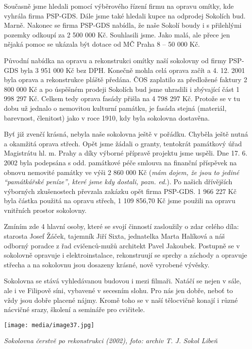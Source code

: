 Současně jsme hledali pomocí výběrového řízení firmu na opravu omítky,
kde vyhrála firma PSP-GDS. Dále jsme také hledali kupce na odprodej
Sokolích bud. Marně. Nakonec se firma PSP-GDS nabídla, že naše Sokolí
boudy i s přilehlými pozemky odkoupí za 2 500 000 Kč. Souhlasili jsme.
Jako malá, ale přece jen nějaká pomoc se ukázala být dotace od MČ Praha
8 -- 50 000 Kč.

Původní nabídka na opravu a rekonstrukci omítky naší sokolovny od firmy
PSP-GDS byla 3 951 000 Kč bez DPH. Konečně mohla celá oprava začít a 4.
12. 2001 byla oprava a rekonstrukce pláště předána. ČOS zaplatilo za
předložené faktury 2 800 000 Kč a po úspěšném prodeji Sokolích bud jsme
uhradili i zbývající část 1 998 297 Kč. Celkem tedy oprava fasády přišla
na 4 798 297 Kč. Protože se v tu dobu už jednalo o nemovitou kulturní
památku, je fasáda stejná (materiál, barevnost, členitost) jako v roce
1910, kdy byla sokolovna dostavěna.

Byť již zvenčí krásná, nebyla naše sokolovna ještě v pořádku. Chyběla
ještě nutná a okamžitá oprava střech. Opět jsme žádali o granty,
tentokrát památkový úřad Magistrátu hl. m. Prahy a díky výborné přípravě
projektu jsme uspěli. Dne 17. 6. 2002 byla podepsána s odd. památkové
péče smlouva na finanční příspěvek na obnovu nemovité památky ve výši 2
860 000 Kč (\emph{mám dojem, že jsou to jediné ``památkářské peníze'',
které jsme kdy dostali, pozn. ed.}). Po našich dřívějších výborných
zkušenostech převzala zakázku opět firma PSP-GDS. 1 966 227 Kč byla
částka použitá na opravu střech, 1 109 856,70 Kč jsme použili na opravu
vnitřních prostor sokolovny.

Zmíním zde 4 hlavní osoby, které se svojí činností zasloužily o zdar
celého díla: starosta Josef Žáček, tajemník Jiří Sixta, jednatelka Marta
Halíková a náš odborný poradce z řad cvičenců-mužů architekt Pavel
Jakoubek. Postupně se v sokolovně opravuje i elektroinstalace,
rekonstruují se sprchy a záchody a opravuje střecha a na sokolovnu jsou
dosazeny krásné, nově vyrobené vývěsky.

Sokolovna se stává vyhledávanou budovou i mezi filmaři. Natáčí se nejen
v sále, ale i ve Filipově síni, vybavené v secesním slohu. Pro nás jen
dobře, neboť to vždy jsou dobře placené nájmy. Kromě toho se v naší
tělocvičně konají i různé nácvičné srazy, školení a semináře pro
cvičitele.

\texttt{[image: media/image37.jpg]}

\emph{Sokolovna čerstvě po rekonstrukci (2002), foto: archiv T. J. Sokol
Libeň}

